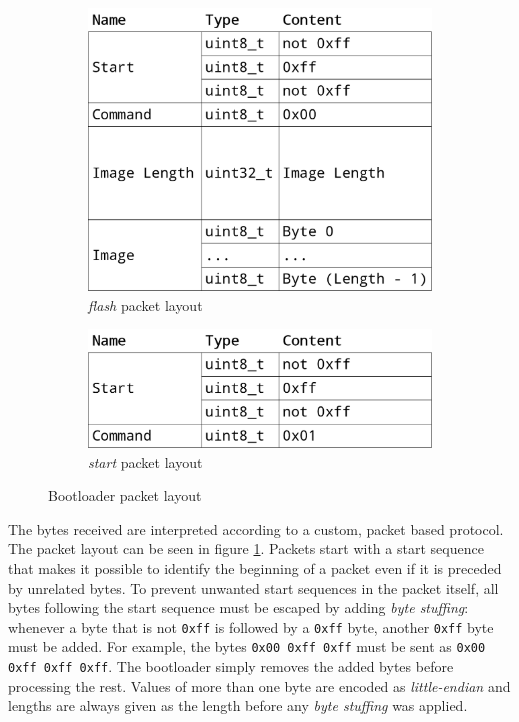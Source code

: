 \begin{figure}[ht]
    \centering

    \begin{subfigure}[t]{0.5\textwidth}
        \centering
        \includegraphics[scale=0.18]{img/bootloader_flash_packet.png}
        \caption{\textit{flash} packet layout}
    \end{subfigure}%
    \begin{subfigure}[t]{0.5\textwidth}
        \centering
        \includegraphics[scale=0.18]{img/bootloader_start_packet.png}
        \caption{\textit{start} packet layout}
    \end{subfigure}

    \caption{Bootloader packet layout}
    \label{implementation/software/bootloader/packet-layout}
\end{figure}

The bytes received are interpreted according to a custom, packet based protocol. The packet layout
can be seen in figure \ref{implementation/software/bootloader/packet-layout}. Packets start with a
start sequence that makes it possible to identify the beginning of a packet even if it is preceded
by unrelated bytes. To prevent unwanted start sequences in the packet itself, all bytes following
the start sequence must be escaped by adding \textit{byte stuffing}: whenever a byte that is not
\lstinline{0xff} is followed by a \lstinline{0xff} byte, another \lstinline{0xff} byte must be added.
For example, the bytes \lstinline{0x00 0xff 0xff} must be sent as \lstinline{0x00 0xff 0xff 0xff}.
The bootloader simply removes the added bytes before processing the rest. Values of more than one
byte are encoded as \textit{little-endian} and lengths are always given as the length before any
\textit{byte stuffing} was applied.

